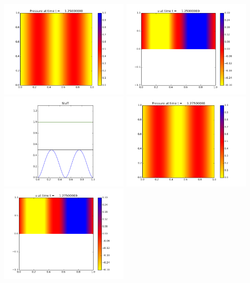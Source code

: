 \documentclass[11pt]{article}
\begin{document}
\vskip 10pt 
\includegraphics[width=0.475\textwidth]{frame0050fig0.png}
\includegraphics[width=0.475\textwidth]{frame0050fig1.png}
\vskip 10pt 
\includegraphics[width=0.475\textwidth]{frame0050fig3.png}
\vskip 10pt 
\includegraphics[width=0.475\textwidth]{frame0051fig0.png}
\includegraphics[width=0.475\textwidth]{frame0051fig1.png}
\end{document}
